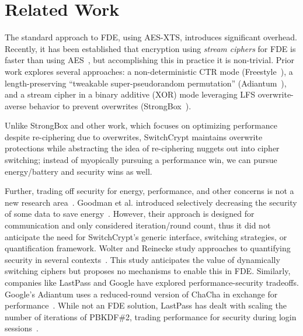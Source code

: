 \section{Related Work} \label{sec:related}

The standard approach to FDE, using AES-XTS, introduces significant overhead.
Recently, it has been established that encryption using \emph{stream ciphers}
for FDE is faster than using AES~\cite{StrongBox}, but accomplishing this in
practice it is non-trivial. Prior work explores several approaches: a
non-deterministic CTR mode (Freestyle~\cite{Freestyle}), a length-preserving
``tweakable super-pseudorandom permutation'' (Adiantum~\cite{Adiantum}), and a
stream cipher in a binary additive (XOR) mode leveraging LFS overwrite-averse
behavior to prevent overwrites (StrongBox~\cite{StrongBox}).

Unlike StrongBox and other work, which focuses on optimizing performance despite
re-ciphering due to overwrites, SwitchCrypt maintains overwrite protections
while abstracting the idea of re-ciphering nuggets out into cipher switching;
instead of myopically pursuing a performance win, we can pursue energy/battery
and security wins as well.

Further, trading off security for energy, performance, and other concerns is not
a new research area~\cite{ScalableSecurity, WolterReinecke, ZengChow1,
HaleemEtAl, LiOmiecinski, Merkel4, Merkle3}. Goodman et al. introduced
selectively decreasing the security of some data to save
energy~\cite{ScalableSecurity}. However, their approach is designed for
communication and only considered iteration/round count, thus it did not
anticipate the need for SwitchCrypt's generic interface, switching strategies,
or quantification framework. Wolter and Reinecke study approaches to quantifying
security in several contexts~\cite{WolterReinecke}. This study anticipates the
value of dynamically switching ciphers but proposes no mechanisms to enable this
in FDE. Similarly, companies like LastPass and Google have explored
performance-security tradeoffs. Google's Adiantum uses a reduced-round version
of ChaCha in exchange for performance~\cite{Adiantum}. While not an FDE
solution, LastPass has dealt with scaling the number of iterations of PBKDF\#2,
trading performance for security during login sessions~\cite{LastPass}.
